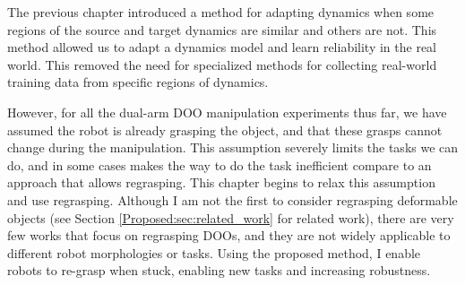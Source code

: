 The previous chapter introduced a method for adapting dynamics when some regions of the source and target dynamics are similar and others are not. This method allowed us to adapt a dynamics model and learn reliability in the real world. This removed the need for specialized methods for collecting real-world training data from specific regions of dynamics.

However, for all the dual-arm DOO manipulation experiments thus far, we have assumed the robot is already grasping the object, and that these grasps cannot change during the manipulation. This assumption severely limits the tasks we can do, and in some cases makes the way to do the task inefficient compare to an approach that allows regrasping. This chapter begins to relax this assumption and use regrasping. Although I am not the first to consider regrasping deformable objects (see Section \ref{Proposed:sec:related_work} for related work), there are very few works that focus on regrasping DOOs, and they are not widely applicable to different robot morphologies or tasks. Using the proposed method, I enable robots to re-grasp when stuck, enabling new tasks and increasing robustness.








